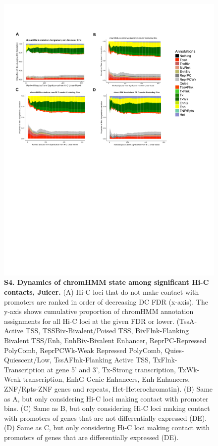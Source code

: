 \begin{figure}[!htb]
\centering
\includegraphics[width=6in]{img/figS4.pdf}
\caption[Dynamics of chromHMM state among significant Hi-C contacts, Juicer.]{\textbf{S4. Dynamics of chromHMM state among significant Hi-C contacts, Juicer.} (A) Hi-C loci that do not make contact with promoters are ranked in order of decreasing DC FDR (x-axis). The y-axis shows cumulative proportion of chromHMM annotation assignments for all Hi-C loci at the given FDR or lower. (TssA-Active TSS, TSSBiv-Bivalent/Poised TSS, BivFlnk-Flanking Bivalent TSS/Enh, EnhBiv-Bivalent Enhancer, ReprPC-Repressed PolyComb, ReprPCWk-Weak Repressed PolyComb, Quies-Quiescent/Low, TssAFlnk-Flanking Active TSS, TxFlnk-Transcription at gene 5' and 3', Tx-Strong transcription, TxWk-Weak transcription, EnhG-Genic Enhancers, Enh-Enhancers, ZNF/Rpts-ZNF genes and repeats, Het-Heterochromatin). (B) Same as A, but only considering Hi-C loci making contact with promoter bins. (C) Same as B, but only considering Hi-C loci making contact with promoters of genes that are not differentially expressed (DE). (D) Same as C, but only considering Hi-C loci making contact with promoters of genes that are differentially expressed (DE).}
\label{fig:figS4}
\end{figure}

